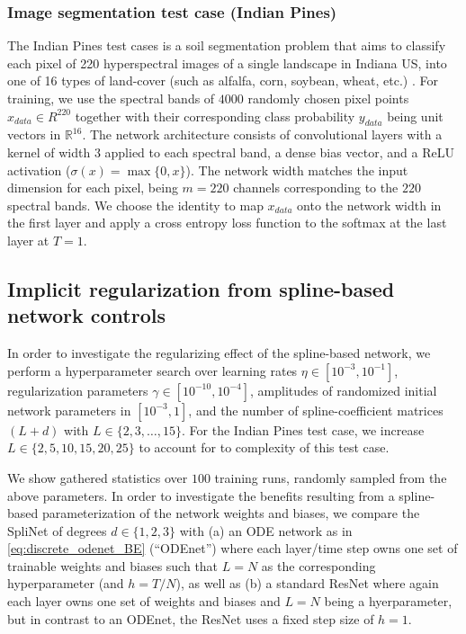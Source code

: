 \documentclass[12pt]{amsart}
\newcommand{\R}{\mathds{R}}
\begin{document}
\subsubsection{Image segmentation test case (Indian Pines)}
The Indian Pines test cases is a soil segmentation problem that aims to classify each pixel of 220 hyperspectral images of a single landscape in Indiana US, into one of 16 types of land-cover (such as alfalfa, corn, soybean, wheat, etc.) \cite{PURR1947}.
For training, we use the spectral bands of $4000$ randomly chosen pixel points $x_{data} \in R^{220}$ together with their corresponding class probability $y_{data}$ being unit vectors in $\R^{16}$. The network architecture consists of convolutional layers with a kernel of width $3$ applied to each spectral band, a dense bias vector, and a ReLU activation ($\sigma(x) = \max\{0,x\}$). The network width matches the input dimension for each pixel, being $m=220$ channels corresponding to the $220$ spectral bands. We choose the identity to map $x_{data}$ onto the network width in the first layer and apply a cross entropy loss function to the softmax at the last layer at $T=1$.


\subsection{Implicit regularization from spline-based network controls}
In order to investigate the regularizing effect of the spline-based network, we perform a hyperparameter search over learning rates $\eta\in[10^{-3},10^{-1}]$, regularization parameters $\gamma \in[10^{-10},10^{-4}]$, amplitudes of randomized initial network parameters in $[10^{-3}, 1]$, and the number of spline-coefficient matrices $(L+d)$ with $L \in \{2,3,\dots,15\}$. For the Indian Pines test case, we increase $L \in\{2,5,10,15,20,25\}$ to account for to complexity of this test case.

We show gathered statistics over $100$ training runs, randomly sampled from the above parameters. In order to investigate the benefits resulting from a spline-based parameterization of the network weights and biases, we compare the SpliNet of degrees $d\in \{1,2,3\}$ with (a) an ODE network as in \eqref{eq:discrete_odenet_BE} (``ODEnet'') where each layer/time step owns one set of trainable weights and biases such that $L=N$ as the corresponding hyperparameter (and $h = T/N$), as well as (b) a standard ResNet where again each layer owns one set of weights and biases and $L=N$ being a hyerparameter, but in contrast to an ODEnet, the ResNet uses a fixed step size of $h=1$.
\end{document}
